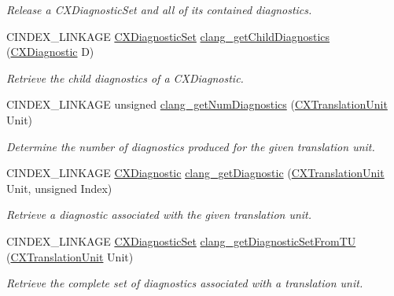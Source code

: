 \begin{DoxyCompactItemize}
\begin{DoxyCompactList}\small\item\em Release a C\+X\+Diagnostic\+Set and all of its contained diagnostics. \end{DoxyCompactList}\item 
C\+I\+N\+D\+E\+X\+\_\+\+L\+I\+N\+K\+A\+GE \hyperlink{group__CINDEX__DIAG_ga38dfc0ae45b55bf7fd577eed9148e244}{C\+X\+Diagnostic\+Set} \hyperlink{group__CINDEX__DIAG_ga1aa24f925b34bb988dc3ea06ec27dcda}{clang\+\_\+get\+Child\+Diagnostics} (\hyperlink{group__CINDEX__DIAG_ga44bb8aba7c40590ad25d1763c4fbff7f}{C\+X\+Diagnostic} D)
\begin{DoxyCompactList}\small\item\em Retrieve the child diagnostics of a C\+X\+Diagnostic. \end{DoxyCompactList}\item 
\mbox{\label{group__CINDEX__DIAG_gae9f047b4bbbbb01161478d549b7aab25}} 
C\+I\+N\+D\+E\+X\+\_\+\+L\+I\+N\+K\+A\+GE unsigned \hyperlink{group__CINDEX__DIAG_gae9f047b4bbbbb01161478d549b7aab25}{clang\+\_\+get\+Num\+Diagnostics} (\hyperlink{group__CINDEX_gacdb7815736ca709ce9a5e1ec2b7e16ac}{C\+X\+Translation\+Unit} Unit)
\begin{DoxyCompactList}\small\item\em Determine the number of diagnostics produced for the given translation unit. \end{DoxyCompactList}\item 
C\+I\+N\+D\+E\+X\+\_\+\+L\+I\+N\+K\+A\+GE \hyperlink{group__CINDEX__DIAG_ga44bb8aba7c40590ad25d1763c4fbff7f}{C\+X\+Diagnostic} \hyperlink{group__CINDEX__DIAG_ga3f54a79e820c2ac9388611e98029afe5}{clang\+\_\+get\+Diagnostic} (\hyperlink{group__CINDEX_gacdb7815736ca709ce9a5e1ec2b7e16ac}{C\+X\+Translation\+Unit} Unit, unsigned Index)
\begin{DoxyCompactList}\small\item\em Retrieve a diagnostic associated with the given translation unit. \end{DoxyCompactList}\item 
C\+I\+N\+D\+E\+X\+\_\+\+L\+I\+N\+K\+A\+GE \hyperlink{group__CINDEX__DIAG_ga38dfc0ae45b55bf7fd577eed9148e244}{C\+X\+Diagnostic\+Set} \hyperlink{group__CINDEX__DIAG_gaf786e9688b9a685958e486cb81910924}{clang\+\_\+get\+Diagnostic\+Set\+From\+TU} (\hyperlink{group__CINDEX_gacdb7815736ca709ce9a5e1ec2b7e16ac}{C\+X\+Translation\+Unit} Unit)
\begin{DoxyCompactList}\small\item\em Retrieve the complete set of diagnostics associated with a translation unit. \end{DoxyCompactList}\item 

\end{DoxyCompactItemize}
